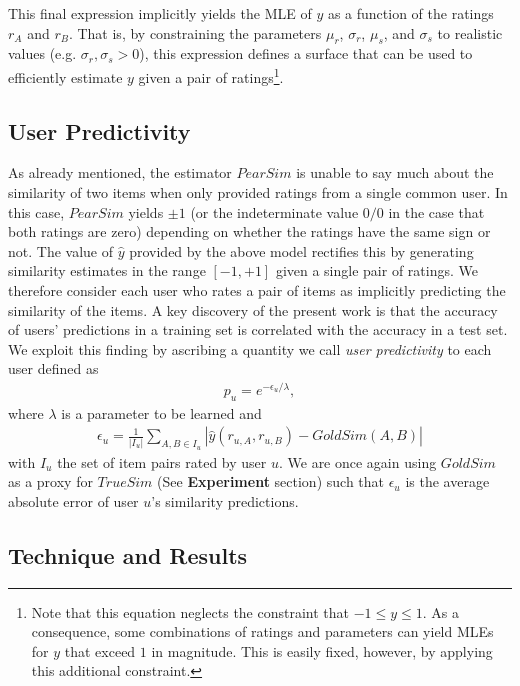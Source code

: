 \documentclass[11pt]{article}
\begin{document}
This final expression implicitly yields the MLE of $y$ as a function of the
ratings $r_A$ and $r_B$. That is, by constraining the parameters $\mu_r$,
$\sigma_r$, $\mu_s$, and $\sigma_s$ to realistic values (e.g. $\sigma_r,
\sigma_s > 0$), this expression defines a surface that can be used to
efficiently estimate $y$ given a pair of ratings\footnote{Note that this
equation neglects the constraint that $-1 \leq y \leq 1$. As a consequence, some
combinations of ratings and parameters can yield MLEs for $y$ that exceed $1$ in
magnitude. This is easily fixed, however, by applying this additional
constraint.}.

\subsection*{User Predictivity}

As already mentioned, the estimator $PearSim$ is unable to say much about the
similarity of two items when only provided ratings from a single common user. In
this case, $PearSim$ yields $\pm1$ (or the indeterminate value $0/0$ in the case
that both ratings are zero) depending on whether the ratings have the same sign
or not. The value of $\hat{y}$ provided by the above model rectifies this by
generating similarity estimates in the range $[-1, +1]$ given a single pair of
ratings. We therefore consider each user who rates a pair of items as implicitly
predicting the similarity of the items. A key discovery of the present work is
that the accuracy of users' predictions in a training set is correlated with the
accuracy in a test set. We exploit this finding by ascribing a quantity we call
{\em user predictivity} to each user defined as
\begin{align}\label{eqn:predictivity}
p_u = e^{-\epsilon_u/\lambda},
\end{align}
where $\lambda$ is a parameter to be learned and
\begin{align}\label{eqn:userError}
\epsilon_u = \frac{1}{\left|I_u\right|}
\sum_{A,B \in I_u}{\left|\hat{y}(r_{u,A},r_{u,B}) - GoldSim(A, B)\right|}
\end{align}
with $I_u$ the set of item pairs rated by user $u$. We are once again using
$GoldSim$ as a proxy for $TrueSim$ (See {\bf Experiment} section) such that
$\epsilon_u$ is the average absolute error of user $u$'s similarity predictions.

\subsection*{Technique and Results}
\end{document}
